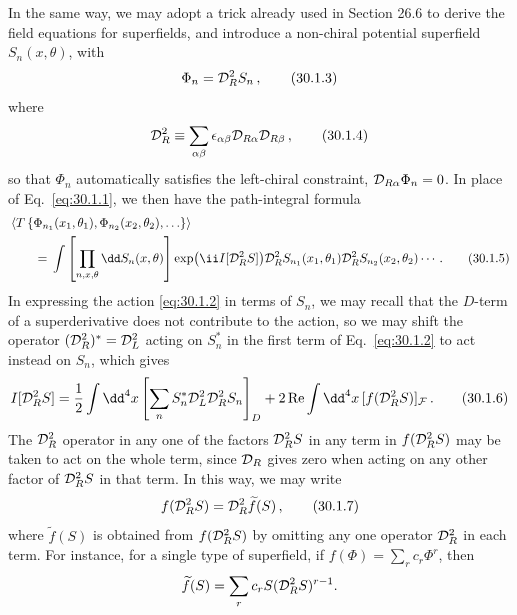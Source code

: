 In the same way, we may adopt a trick already used in Section 26.6 to derive
the field equations for superfields, and introduce a non-chiral potential
superfield \(S_n(x,\theta)\), with
\begin{equation}
  \Phi_n=\mathcal{D}_R^2S_n\,,
  \tag{30.1.3}\label{eq:30.1.3}
\end{equation}
where
\begin{equation}
  \mathcal{D}_R^2
  \equiv\sum_{\alpha\beta}
    \epsilon_{\alpha\beta}
    \mathcal{D}_{R\alpha}\mathcal{D}_{R\beta}\,,
  \tag{30.1.4}\label{eq:30.1.4}
\end{equation}
so that \(\Phi_n\) automatically satisfies the left-chiral constraint,
\(\mathcal{D}_{R\alpha}\Phi_n=0\). In place of Eq.~\eqref{eq:30.1.1}, we then
have the path-integral formula
\begin{align}
  &\left\langle
    T\left\{\Phi_{n_1}(x_1,\theta_1),
      \Phi_{n_2}(x_2,\theta_2),\ldots\right\}
   \right\rangle \notag\\
  &\qquad={}
  \int\left[\prod_{n,x,\theta}\dd S_n(x,\theta)\right]
    \exp\bigl(\ii I[\SuperD_R^2S]\bigr)
    \SuperD_R^2S_{n_1}(x_1,\theta_1)
    \SuperD_R^2S_{n_2}(x_2,\theta_2)\cdots\,.
  \tag{30.1.5}\label{eq:30.1.5}
\end{align}
In expressing the action \eqref{eq:30.1.2} in terms of \(S_n\), we may recall
that the \(D\)-term of a superderivative does not contribute to the action, so
we may shift the operator
\((\mathcal{D}_R^2)^*=\mathcal{D}_L^2\) acting on \(S_n^*\) in the first term of
Eq.~\eqref{eq:30.1.2} to act instead on \(S_n\), which gives
\begin{equation}
  I[\SuperD_R^2S]
  =\frac12\int \dd^4x
    \left[\sum_n S_n^*\SuperD_L^2\SuperD_R^2S_n\right]_D
   +2\operatorname{Re}\int \dd^4x\,
    [f(\SuperD_R^2S)]_{\mathcal{F}}\,.
  \tag{30.1.6}\label{eq:30.1.6}
\end{equation}
The \(\mathcal{D}_R^2\) operator in any one of the factors \(\mathcal{D}_R^2S\) in
any term in \(f(\mathcal{D}_R^2S)\) may be taken to act on the whole term, since
\(\mathcal{D}_R\) gives zero when acting on any other factor of
\(\mathcal{D}_R^2S\) in that term. In this way, we may write
\begin{equation}
  f(\mathcal{D}_R^2S)=\mathcal{D}_R^2\widetilde f(S)\,,
  \tag{30.1.7}\label{eq:30.1.7}
\end{equation}
where \(\widetilde f(S)\) is obtained from \(f(\mathcal{D}_R^2S)\) by omitting
any one operator \(\mathcal{D}_R^2\) in each term. For instance, for a single
type of superfield, if \(f(\Phi)=\sum_r c_r\Phi^r\), then
\[
  \widetilde f(S)=\sum_r c_rS(\mathcal{D}_R^2S)^{r-1}.
\]

